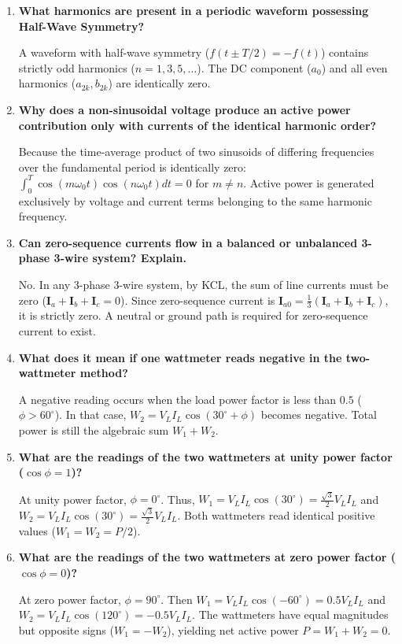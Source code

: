 \documentclass[12pt,a4paper]{article}
\newcommand{\Q}[1]{\textbf{#1}\par\noindent\ignorespaces}
\begin{document}
\begin{tcolorbox}[exambox, title={\textbf{Frequently Asked / Viva Questions}}]
\begin{enumerate}[topsep=0pt, label=\textbf{Q\arabic*.}, itemsep=5pt]
  \item \Q{What harmonics are present in a periodic waveform possessing Half-Wave Symmetry?}
  A waveform with half-wave symmetry ($f(t \pm T/2) = -f(t)$) contains strictly odd harmonics ($n = 1, 3, 5, \dots$). The DC component ($a_0$) and all even harmonics ($a_{2k}, b_{2k}$) are identically zero.

  \item \Q{Why does a non-sinusoidal voltage produce an active power contribution only with currents of the identical harmonic order?}
  Because the time-average product of two sinusoids of differing frequencies over the fundamental period is identically zero: $\int_0^T \cos(m\omega_0 t)\cos(n\omega_0 t)dt = 0$ for $m \ne n$. Active power is generated exclusively by voltage and current terms belonging to the same harmonic frequency.

  \item \Q{Can zero-sequence currents flow in a balanced or unbalanced 3-phase 3-wire system? Explain.}
  No. In any 3-phase 3-wire system, by KCL, the sum of line currents must be zero ($\mathbf{I}_a + \mathbf{I}_b + \mathbf{I}_c = 0$). Since zero-sequence current is $\mathbf{I}_{a0} = \frac{1}{3}(\mathbf{I}_a + \mathbf{I}_b + \mathbf{I}_c)$, it is strictly zero. A neutral or ground path is required for zero-sequence current to exist.

  \item \Q{What does it mean if one wattmeter reads negative in the two-wattmeter method?}
  A negative reading occurs when the load power factor is less than $0.5$ ($\phi > 60^\circ$). In that case, $W_2 = V_L I_L \cos(30^\circ + \phi)$ becomes negative. Total power is still the algebraic sum $W_1 + W_2$.

  \item \Q{What are the readings of the two wattmeters at unity power factor ($\cos\phi = 1$)?}
  At unity power factor, $\phi = 0^\circ$. Thus, $W_1 = V_L I_L \cos(30^\circ) = \frac{\sqrt{3}}{2}V_L I_L$ and $W_2 = V_L I_L \cos(30^\circ) = \frac{\sqrt{3}}{2}V_L I_L$. Both wattmeters read identical positive values ($W_1 = W_2 = P/2$).

  \item \Q{What are the readings of the two wattmeters at zero power factor ($\cos\phi = 0$)?}
  At zero power factor, $\phi = 90^\circ$. Then $W_1 = V_L I_L \cos(-60^\circ) = 0.5 V_L I_L$ and $W_2 = V_L I_L \cos(120^\circ) = -0.5 V_L I_L$. The wattmeters have equal magnitudes but opposite signs ($W_1 = -W_2$), yielding net active power $P = W_1 + W_2 = 0$.


\end{enumerate}
\end{tcolorbox}
\end{document}
